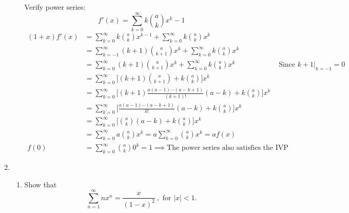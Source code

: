 \documentclass{article}
\begin{document}
\begin{enumerate}[label=(\arabic*)]
\begin{enumerate}
                Verify power series:
                \[f'(x) = \sum_{k=0}^{\infty}k\binom{a}{k}x^k-1\]
                \begin{align*}
                    (1+x)f'(x) &= \sum_{k=0}^\infty k\binom{a}{k} x^{k-1} + \sum_{k=0}^\infty k\binom{a}{k} x^k \\
                    &= \sum_{k=-1}^\infty (k+1)\binom{a}{k+1} x^{k} + \sum_{k=0}^\infty k\binom{a}{k} x^k \\
                    &= \sum_{k=0}^\infty (k+1)\binom{a}{k+1} x^{k} + \sum_{k=0}^\infty k\binom{a}{k} x^k &\text{ Since } k+1|_{k=-1} = 0 \\
                    &= \sum_{k=0}^\infty \Bigg[ (k+1)\binom{a}{k+1} +  k\binom{a}{k} \Bigg] x^k \\
                    &= \sum_{k=0}^\infty \Bigg[ (k+1)\frac{a(a-1)\cdots(a-k+1)}{(k+1)!}(a-k) + k\binom{a}{k} \Bigg] x^k \\
                    &= \sum_{k=0}^\infty \Bigg[ \frac{a(a-1)\cdots(a-k+1)}{k!}(a-k) + k\binom{a}{k} \Bigg] x^k \\
                    &= \sum_{k=0}^\infty \Bigg[ \binom{a}{k}(a-k) + k\binom{a}{k} \Bigg] x^k \\
                    &= \sum_{k=0}^\infty a \binom{a}{k} x^k = a \sum_{k=0}^\infty \binom{a}{k} x^k = af(x) \\
                    f(0) &= \sum_{k=0}^\infty \binom{a}{k} 0^k = 1 \implies \text{The power series also satisfies the IVP}
                \end{align*}
        \end{enumerate}
    \newpage
    \item 
        \begin{enumerate}
            \item Show that
                \[\sum_{n=1}^{\infty}nx^n = \frac{x}{(1-x)^2}\ , \text{ for } |x| < 1.\]


\end{enumerate}
\end{enumerate}
\end{document}
